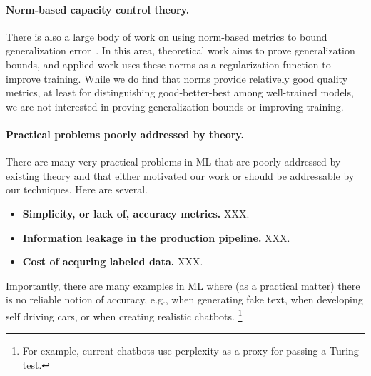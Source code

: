 \paragraph{Norm-based capacity control theory.}

There is also a large body of work on using norm-based metrics to bound generalization error~\cite{NTS15, BFT17_TR, LMBx18_TR}.
In this area, theoretical work aims to prove generalization bounds, and applied work uses these norms as a regularization function to improve training.
While we do find that norms provide relatively good quality metrics, at least for distinguishing good-better-best among well-trained models, we are not interested in proving generalization bounds or improving training.


\paragraph{Practical problems poorly addressed by theory.}
There are many very practical problems in ML that are poorly addressed by existing theory and that either motivated our work or should be addressable by our techniques.
Here are several.
\begin{itemize}
\item
\textbf{Simplicity, or lack of,  accuracy metrics.}
XXX.
\item
\textbf{Information leakage in the production pipeline.}
XXX.
\item
\textbf{Cost of acquring labeled data.}
XXX.
\end{itemize}
Importantly, there are many examples in ML where (as a practical matter) there is no reliable notion of accuracy, e.g., when generating fake text, when developing self driving cars, or when creating realistic chatbots.%
\footnote{For example, current chatbots use perplexity as a proxy for passing a Turing test.}
